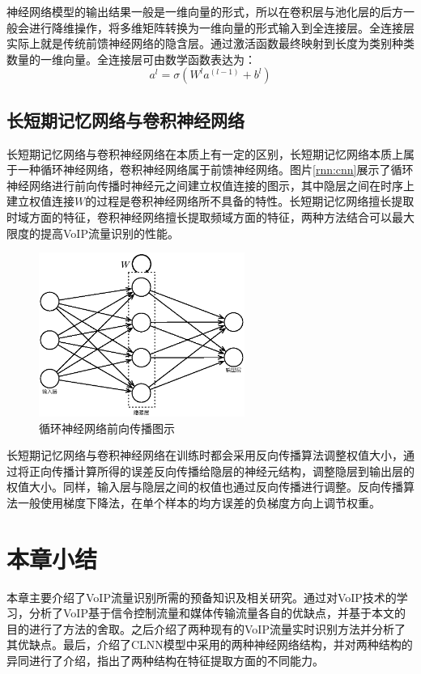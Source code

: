 神经网络模型的输出结果一般是一维向量的形式，所以在卷积层与池化层的后方一般会进行降维操作，将多维矩阵转换为一维向量的形式输入到全连接层。全连接层实际上就是传统前馈神经网络的隐含层。通过激活函数最终映射到长度为类别种类数量的一维向量。全连接层可由数学函数表达为：
\begin{equation}
 a^l= \sigma( W^l a^(l-1)  + b^l)
\end{equation}

\subsection{长短期记忆网络与卷积神经网络}
长短期记忆网络与卷积神经网络在本质上有一定的区别，长短期记忆网络本质上属于一种循环神经网络，卷积神经网络属于前馈神经网络。图片\ref{rnn:cnn}展示了循环神经网络进行前向传播时神经元之间建立权值连接的图示，其中隐层之间在时序上建立权值连接$W$的过程是卷积神经网络所不具备的特性。长短期记忆网络擅长提取时域方面的特征，卷积神经网络擅长提取频域方面的特征，两种方法结合可以最大限度的提高VoIP流量识别的性能。

\begin{figure}[thb]
\begin{center}
\includegraphics[width=0.6\textwidth]{figures/rnn.eps}
\caption{循环神经网络前向传播图示}\label{fig:rnn}
\end{center}
\end{figure}

长短期记忆网络与卷积神经网络在训练时都会采用反向传播算法调整权值大小，通过将正向传播计算所得的误差反向传播给隐层的神经元结构，调整隐层到输出层的权值大小。同样，输入层与隐层之间的权值也通过反向传播进行调整。反向传播算法一般使用梯度下降法，在单个样本的均方误差的负梯度方向上调节权重。

\section{本章小结}
本章主要介绍了VoIP流量识别所需的预备知识及相关研究。通过对VoIP技术的学习，分析了VoIP基于信令控制流量和媒体传输流量各自的优缺点，并基于本文的目的进行了方法的舍取。之后介绍了两种现有的VoIP流量实时识别方法并分析了其优缺点。最后，介绍了CLNN模型中采用的两种神经网络结构，并对两种结构的异同进行了介绍，指出了两种结构在特征提取方面的不同能力。






